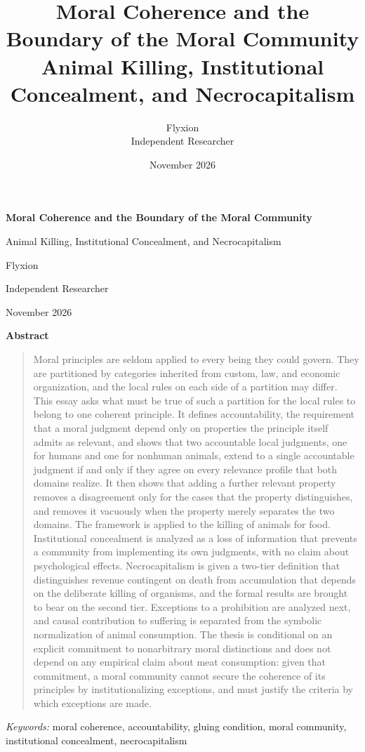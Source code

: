 \documentclass[11pt]{article}
\title{Moral Coherence and the Boundary of the Moral Community\\[0.6ex]
\large Animal Killing, Institutional Concealment, and Necrocapitalism}
\author{Flyxion\\[0.3ex]\small Independent Researcher}
\date{November 2026}
\theoremstyle{definition}
\theoremstyle{plain}
\theoremstyle{definition}
\begin{document}
\begin{titlepage}
\thispagestyle{empty}
\vspace*{0.02\textheight}
\begin{center}
{\Large\bfseries Moral Coherence and the Boundary of the Moral Community\par}
\vspace{1.2ex}
{\large Animal Killing, Institutional Concealment, and Necrocapitalism\par}
\vspace{3ex}
{\large Flyxion\par}
{\small Independent Researcher\par}
\vspace{1ex}
{\small November 2026\par}
\end{center}
\vspace{4ex}
\begin{center}\textbf{Abstract}\end{center}
\vspace{0.5ex}
\begin{quotation}\small
\noindent Moral principles are seldom applied to every being they could govern. They are partitioned by categories inherited from custom, law, and economic organization, and the local rules on each side of a partition may differ. This essay asks what must be true of such a partition for the local rules to belong to one coherent principle. It defines accountability, the requirement that a moral judgment depend only on properties the principle itself admits as relevant, and shows that two accountable local judgments, one for humans and one for nonhuman animals, extend to a single accountable judgment if and only if they agree on every relevance profile that both domains realize. It then shows that adding a further relevant property removes a disagreement only for the cases that the property distinguishes, and removes it vacuously when the property merely separates the two domains. The framework is applied to the killing of animals for food. Institutional concealment is analyzed as a loss of information that prevents a community from implementing its own judgments, with no claim about psychological effects. Necrocapitalism is given a two-tier definition that distinguishes revenue contingent on death from accumulation that depends on the deliberate killing of organisms, and the formal results are brought to bear on the second tier. Exceptions to a prohibition are analyzed next, and causal contribution to suffering is separated from the symbolic normalization of animal consumption. The thesis is conditional on an explicit commitment to nonarbitrary moral distinctions and does not depend on any empirical claim about meat consumption: given that commitment, a moral community cannot secure the coherence of its principles by institutionalizing exceptions, and must justify the criteria by which exceptions are made.
\end{quotation}
\vspace{3ex}
\noindent\textit{Keywords:} moral coherence, accountability, gluing condition, moral community, institutional concealment, necrocapitalism
\end{titlepage}
\end{document}
